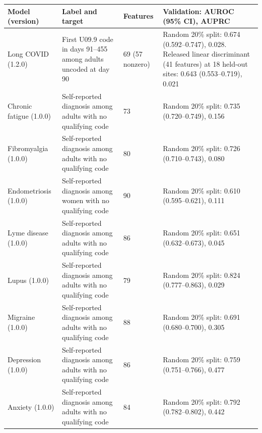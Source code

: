 \begin{tabular}{L{0.15\textwidth}L{0.25\textwidth}L{0.09\textwidth}L{0.42\textwidth}}
\toprule
Model (version) & Label and target & Features & Validation: AUROC (95\% CI), AUPRC \\
\midrule
Long COVID (1.2.0) & First U09.9 code in days 91--455 among adults uncoded at day 90 & 69 (57 nonzero) & Random 20\% split: 0.674 (0.592--0.747), 0.028. Released linear discriminant (41 features) at 18 held-out sites: 0.643 (0.553--0.719), 0.021 \\
Chronic fatigue (1.0.0) & Self-reported diagnosis among adults with no qualifying code & 73 & Random 20\% split: 0.735 (0.720--0.749), 0.156 \\
Fibromyalgia (1.0.0) & Self-reported diagnosis among adults with no qualifying code & 80 & Random 20\% split: 0.726 (0.710--0.743), 0.080 \\
Endometriosis (1.0.0) & Self-reported diagnosis among women with no qualifying code & 90 & Random 20\% split: 0.610 (0.595--0.621), 0.111 \\
Lyme disease (1.0.0) & Self-reported diagnosis among adults with no qualifying code & 86 & Random 20\% split: 0.651 (0.632--0.673), 0.045 \\
Lupus (1.0.0) & Self-reported diagnosis among adults with no qualifying code & 79 & Random 20\% split: 0.824 (0.777--0.863), 0.029 \\
Migraine (1.0.0) & Self-reported diagnosis among adults with no qualifying code & 88 & Random 20\% split: 0.691 (0.680--0.700), 0.305 \\
Depression (1.0.0) & Self-reported diagnosis among adults with no qualifying code & 86 & Random 20\% split: 0.759 (0.751--0.766), 0.477 \\
Anxiety (1.0.0) & Self-reported diagnosis among adults with no qualifying code & 84 & Random 20\% split: 0.792 (0.782--0.802), 0.442 \\
\bottomrule
\end{tabular}

